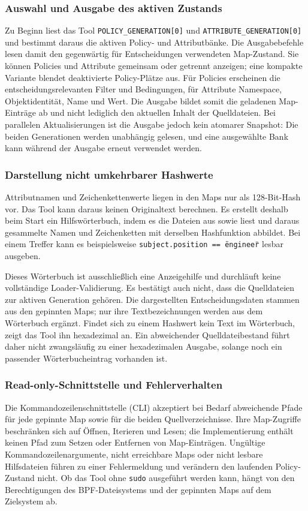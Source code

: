 \subsubsection{Auswahl und Ausgabe des aktiven Zustands}
Zu Beginn liest das Tool \texttt{POLICY\_GENERATION[0]} und \texttt{ATTRIBUTE\_GENERATION[0]} und bestimmt daraus die aktiven Policy- und Attributbänke. Die Ausgabebefehle lesen damit den gegenwärtig für Entscheidungen verwendeten Map-Zustand. Sie können Policies und Attribute gemeinsam oder getrennt anzeigen; eine kompakte Variante blendet deaktivierte Policy-Plätze aus. Für Policies erscheinen die entscheidungsrelevanten Filter und Bedingungen, für Attribute Namespace, Objektidentität, Name und Wert. Die Ausgabe bildet somit die geladenen Map-Einträge ab und nicht lediglich den aktuellen Inhalt der Quelldateien.
Bei parallelen Aktualisierungen ist die Ausgabe jedoch kein atomarer Snapshot: Die beiden Generationen werden unabhängig gelesen, und eine ausgewählte Bank kann während der Ausgabe erneut verwendet werden.

\subsubsection{Darstellung nicht umkehrbarer Hashwerte}
Attributnamen und Zeichenkettenwerte liegen in den Maps nur als 128-Bit-Hash vor. Das Tool kann daraus keinen Originaltext berechnen. Es erstellt deshalb beim Start ein Hilfswörterbuch, indem es die Dateien aus  sowie  liest und daraus gesammelte Namen und Zeichenketten mit derselben Hashfunktion abbildet. Bei einem Treffer kann es beispielsweise \texttt{subject.position == \"engineer\"} lesbar ausgeben.

Dieses Wörterbuch ist ausschließlich eine Anzeigehilfe und durchläuft keine vollständige Loader-Validierung. Es bestätigt auch nicht, dass die Quelldateien zur aktiven Generation gehören. Die dargestellten Entscheidungsdaten stammen aus den gepinnten Maps; nur ihre Textbezeichnungen werden aus dem Wörterbuch ergänzt. Findet sich zu einem Hashwert kein Text im Wörterbuch, zeigt das Tool ihn hexadezimal an. Ein abweichender Quelldateibestand führt daher nicht zwangsläufig zu einer hexadezimalen Ausgabe, solange noch ein passender Wörterbucheintrag vorhanden ist.

\subsubsection{Read-only-Schnittstelle und Fehlerverhalten}
Die Kommandozeilenschnittstelle (CLI) akzeptiert bei Bedarf abweichende Pfade für jede gepinnte Map sowie für die beiden Quellverzeichnisse. Ihre Map-Zugriffe beschränken sich auf Öffnen, Iterieren und Lesen; die Implementierung enthält keinen Pfad zum Setzen oder Entfernen von Map-Einträgen. Ungültige Kommandozeilenargumente, nicht erreichbare Maps oder nicht lesbare Hilfsdateien führen zu einer Fehlermeldung und verändern den laufenden Policy-Zustand nicht. Ob das Tool ohne \texttt{sudo} ausgeführt werden kann, hängt von den Berechtigungen des BPF-Dateisystems und der gepinnten Maps auf dem Zielsystem ab.


